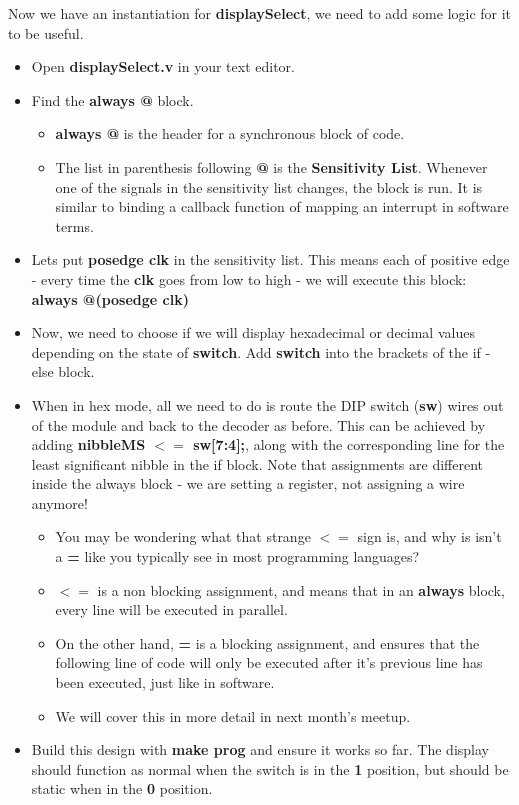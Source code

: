 \documentclass[12pt,a4paper]{article}
\begin{document}
\noindent
Now we have an instantiation for \textbf{displaySelect}, we need to add some logic for it to be useful.
\begin{itemize}
	\item Open \textbf{displaySelect.v} in your text editor. 
	\item Find the \textbf{always @} block.
	\begin{itemize}
		\item \textbf{always @} is the header for a synchronous block of code.
		\item The list in parenthesis following \textbf{@} is the \textbf{Sensitivity List}. Whenever one of the signals in the sensitivity list changes, the block is run. It is similar to binding a callback function of mapping an interrupt in software terms. 
	\end{itemize} 
		\item Lets put \textbf{posedge clk} in the sensitivity list. This means each of positive edge - every time the \textbf{clk} goes from low to high - we will execute this block: \\ \textbf{always @(posedge clk)}
		\item Now, we need to choose if we will display hexadecimal or decimal values depending on the state of \textbf{switch}. Add \textbf{switch} into the brackets of the if - else block. 
		\item When in hex mode, all we need to do is route the DIP switch (\textbf{sw}) wires out of the module and back to the decoder as before. This can be achieved by adding \textbf{nibbleMS $<=$ sw[7:4];}, along with the corresponding line for the least significant nibble in the if block. Note that assignments are different inside the always block - we are setting a register, not assigning a wire anymore! 
		\begin{itemize}
			\item You may be wondering what that strange \textbf{$<=$} sign is, and why is isn't a \textbf{=} like you typically see in most programming languages?
			\item \textbf{$<=$} is a non blocking assignment, and means that in an \textbf{always} block, every line will be executed in parallel. 
			\item On the other hand, \textbf{=} is a blocking assignment, and ensures that the following line of code will only be executed after it's previous line has been executed, just like in software. 
			\item We will cover this in more detail in next month's meetup.
		\end{itemize}
		\item Build this design with \textbf{make prog} and ensure it works so far. The display should function as normal when the switch is in the \textbf{1} position, but should be static when in the \textbf{0} position. 
	\end{itemize}
\end{document}
